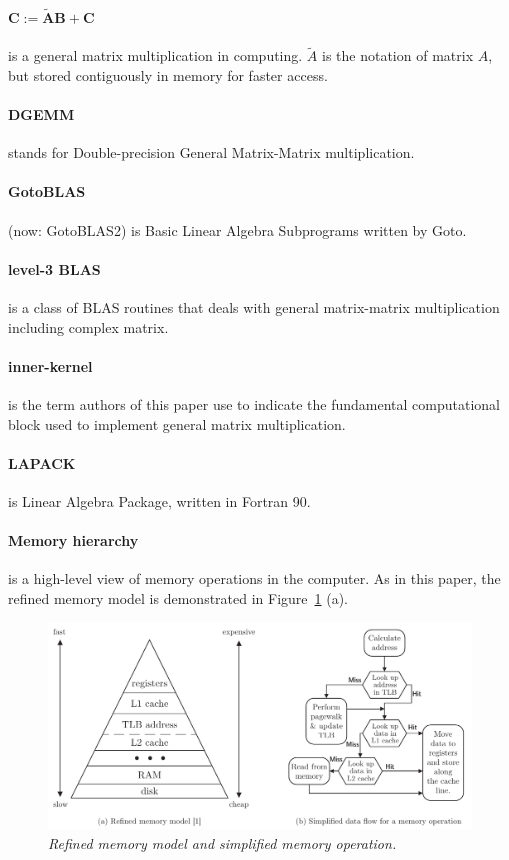 \documentclass[a4paper,12pt]{article}
\begin{document}
\paragraph{$\mathbold{C:= \tilde{A}B + C}$} is a general matrix multiplication in computing. $\tilde{A}$ is the notation of matrix $A$, but stored contiguously in memory for faster access.
\vspace{-1em}
\paragraph{DGEMM} stands for Double-precision General Matrix-Matrix multiplication.
\vspace{-1em}
\paragraph{GotoBLAS} (now: GotoBLAS2) is Basic Linear Algebra Subprograms written by Goto.
\vspace{-1em}
\paragraph{level-3 BLAS} is a class of BLAS routines that deals with general matrix-matrix multiplication including complex matrix.
\vspace{-1em}
\paragraph{inner-kernel} is the term authors of this paper use to indicate the fundamental computational block used to implement general matrix multiplication.
\vspace{-1em}
\paragraph{LAPACK} is Linear Algebra Package, written in Fortran 90.
\vspace{-1em}
\paragraph{Memory hierarchy} is a high-level view of memory operations in the computer. As in this paper, the refined memory model is demonstrated in Figure~\ref{fig:mem} (a).
\begin{figure}[h]
    \includegraphics[width=\textwidth]{fmcs_a3_mem}
    \caption{\emph{Refined memory model and simplified memory operation.}}
    \label{fig:mem}
\end{figure}
\end{document}
